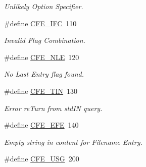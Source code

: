 \begin{CompactItemize}
\begin{CompactList}\small\item\em Unlikely Option Specifier. \item\end{CompactList}\item 
\hypertarget{group__errors_g78354f23ff4d92bd3fd6dcb6bfd59f52}{
\#define \hyperlink{group__errors_g78354f23ff4d92bd3fd6dcb6bfd59f52}{CFE\_\-IFC}~110}
\label{group__errors_g78354f23ff4d92bd3fd6dcb6bfd59f52}

\begin{CompactList}\small\item\em Invalid Flag Combination. \item\end{CompactList}\item 
\hypertarget{group__errors_g92aa7a17d2248b62f428d9e655f7d35e}{
\#define \hyperlink{group__errors_g92aa7a17d2248b62f428d9e655f7d35e}{CFE\_\-NLE}~120}
\label{group__errors_g92aa7a17d2248b62f428d9e655f7d35e}

\begin{CompactList}\small\item\em No Last Entry flag found. \item\end{CompactList}\item 
\hypertarget{group__errors_g3e780bea24126b1d0750f3ee7a96b8a8}{
\#define \hyperlink{group__errors_g3e780bea24126b1d0750f3ee7a96b8a8}{CFE\_\-TIN}~130}
\label{group__errors_g3e780bea24126b1d0750f3ee7a96b8a8}

\begin{CompactList}\small\item\em Error reTurn from stdIN query. \item\end{CompactList}\item 
\hypertarget{group__errors_g9e2ead53d32b9cf9f0e280a452c8e2e6}{
\#define \hyperlink{group__errors_g9e2ead53d32b9cf9f0e280a452c8e2e6}{CFE\_\-EFE}~140}
\label{group__errors_g9e2ead53d32b9cf9f0e280a452c8e2e6}

\begin{CompactList}\small\item\em Empty string in content for Filename Entry. \item\end{CompactList}\item 
\hypertarget{group__errors_gee86803a95d7d53a01c86f98c231aa7c}{
\#define \hyperlink{group__errors_gee86803a95d7d53a01c86f98c231aa7c}{CFE\_\-USG}~200}
\label{group__errors_gee86803a95d7d53a01c86f98c231aa7c}


\end{CompactItemize}
